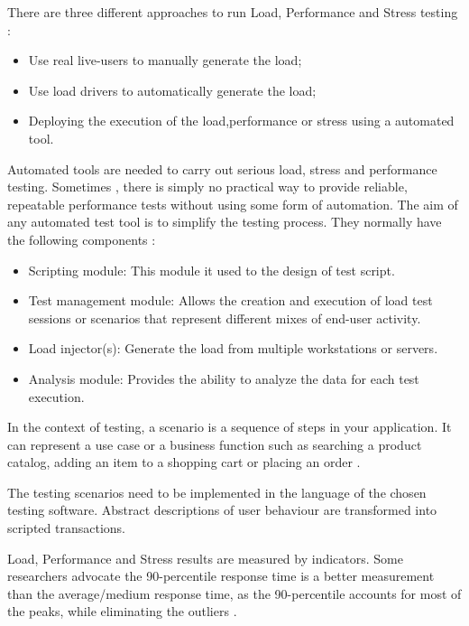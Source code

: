 There are three different approaches to run Load, Performance and Stress testing \cite{Jiang2010}:

\begin{itemize}
\item Use real live-users to manually generate the load;
\item Use load drivers to automatically generate the load;
\item Deploying the execution of the load,performance or stress using a automated tool.
%
%
\end{itemize}

Automated tools are needed to carry out serious load, stress and performance testing. Sometimes , there is simply no practical way to provide reliable, repeatable performance tests without using some form of automation. The aim of any automated test tool is to simplify the testing process. They normally have the following components \cite{Molyneaux2009}:

\begin{itemize}
\item Scripting module: This module it used to the design of test script.
%
%
\item Test management module: Allows the creation and execution of load test sessions or scenarios that represent different mixes of end-user activity.
\item Load injector(s): Generate the load from multiple workstations or servers.
\item Analysis module: Provides the ability to analyze the data for each test execution.
\end{itemize}

In the context of  testing, a scenario is a sequence of steps in your application. It can represent a use case or a business function such as searching a product catalog, adding an item to a shopping cart or placing an order \cite{Corporation2007}. 

The testing scenarios need to be implemented in the language of the chosen testing software. Abstract descriptions of user behaviour are transformed into scripted transactions.

Load, Performance and Stress results are measured by indicators. Some researchers advocate the 90-percentile response time is a better measurement than the average/medium response time, as the 90-percentile accounts for most of the peaks, while eliminating the outliers \cite{Jiang2010}.